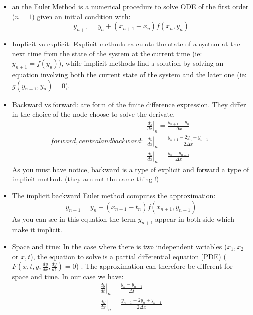 \documentclass[11pt,a4paper]{report}
\begin{document}
\begin{itemize}
\item an the \href{https://en.wikipedia.org/wiki/Euler_method}{Euler Method} is a numerical procedure to solve ODE of the first order ($n=1$) given an initial condition with:
\begin{equation}
y_{n+1}=y_n+(x_{n+1}-x_n)f(x_n,y_n)
\end{equation}
\item \href{https://en.wikipedia.org/wiki/Explicit_and_implicit_methods}{Implicit vs explicit}: Explicit methods calculate the state of a system at the next time from the state of the system at the current time (ie: $y_{n+1} = f(y_n)$), while implicit methods find a solution by solving an equation involving both the current state of the system and the later one (ie: $g(y_{n+1},y_n)=0$).

\item \href{}{Backward vs forward}: are form of the finite difference expression. They differ in the choice of the node choose to solve the derivate.
\begin{subequations}
forward, central and backward:
\begin{align}
        \left. \frac{d y}{d x}\right|_n=\frac{y_{n+1}-y_n}{\Delta x} \\
        \left. \frac{d y}{d x}\right|_n=\frac{y_{n+1}-2y_n+y_{n-1}}{2\Delta x} \\
		\left. \frac{d y}{d x}\right|_n=\frac{y_{n}-y_{n-1}}{\Delta x}
\end{align}
\end{subequations}
As you must have notice, backward is a type of explicit and forward a type of implicit method. (they are not the same thing !)
\item The \href{https://en.wikipedia.org/wiki/Backward_Euler_method}{implicit backward Euler method} computes the approximation:
\begin{equation}
y_{n+1} = y_n +(x_{n+1}-t_n) f(x_{n+1},y_{n+1})
\end{equation}
As you can see in this equation the term $y_{n+1}$ appear in both side which make it implicit.

\item Space and time: In the case where there is two \href{https://en.wikipedia.org/wiki/Dependent_and_independent_variables}{independent variables} ($x_1,x_2$ or $x,t$), the equation to solve is a \href{https://en.wikipedia.org/wiki/Partial_differential_equation}{partial differential equation} (PDE) ($F(x,t,y,\frac{dy}{dx},\frac{dy}{dt})=0$) . The approximation can therefore be different for space and time. In our case we have:
\begin{subequations}
\begin{align}
        \left. \frac{d y}{d t}\right|_n=\frac{y_n-y_{n-1}}{\Delta t} \\
        \left. \frac{d y}{d x}\right|_n=\frac{y_{n+1}-2y_n+y_{n-1}}{2\Delta x} \\
\end{align}
\end{subequations}
\end{itemize}
\end{document}
